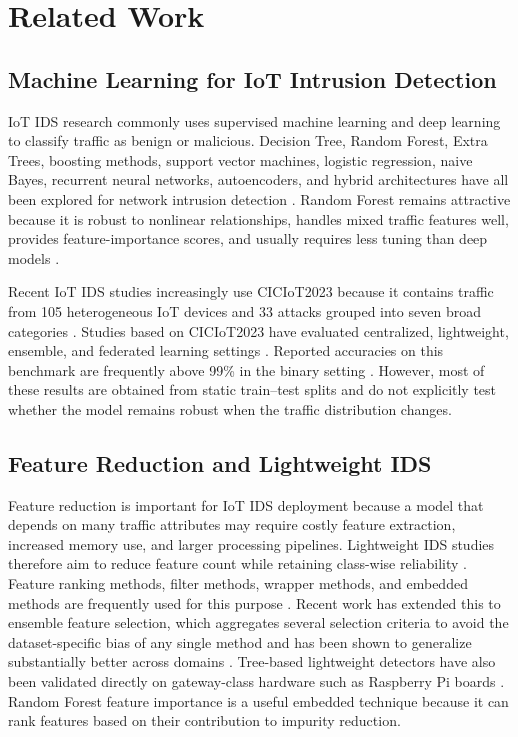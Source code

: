 \documentclass[11pt,a4paper]{article}
\begin{document}
\section{Related Work}
\label{sec:related}

\subsection{Machine Learning for IoT Intrusion Detection}

IoT IDS research commonly uses supervised machine learning and deep
learning to classify traffic as benign or malicious. Decision Tree,
Random Forest, Extra Trees, boosting methods, support vector machines,
logistic regression, naive Bayes, recurrent neural networks,
autoencoders, and hybrid architectures have all been explored for
network intrusion detection
\cite{khraisat2019,gyamfi2022,rahman2025}. Random Forest remains
attractive because it is robust to nonlinear relationships, handles
mixed traffic features well, provides feature-importance scores, and
usually requires less tuning than deep models \cite{breiman2001}.

Recent IoT IDS studies increasingly use CICIoT2023 because it contains
traffic from 105 heterogeneous IoT devices and 33 attacks grouped into
seven broad categories \cite{neto2023}. Studies based on CICIoT2023 have
evaluated centralized, lightweight, ensemble, and federated learning
settings \cite{wardana2024,kouassi2025,wakili2025,abbas2024,bikila2024}.
Reported accuracies on this benchmark are frequently above 99\% in the
binary setting \cite{alharby2025,jony2024}. However, most of these
results are obtained from static train--test splits and do not
explicitly test whether the model remains robust when the traffic
distribution changes.

\subsection{Feature Reduction and Lightweight IDS}

Feature reduction is important for IoT IDS deployment because a model
that depends on many traffic attributes may require costly feature
extraction, increased memory use, and larger processing pipelines.
Lightweight IDS studies therefore aim to reduce feature count while
retaining class-wise reliability \cite{ozer2021,kumar2022,roy2022}.
Feature ranking methods, filter methods, wrapper methods, and embedded
methods are frequently used for this purpose \cite{guyon2003}. Recent
work has extended this to ensemble feature selection, which aggregates
several selection criteria to avoid the dataset-specific bias of any
single method and has been shown to generalize substantially better
across domains \cite{fatima2024survey,fatima2024elids}. Tree-based
lightweight detectors have also been validated directly on gateway-class
hardware such as Raspberry Pi boards \cite{mishra2024}. Random Forest
feature importance is a useful embedded technique because it can rank
features based on their contribution to impurity reduction.
\end{document}
